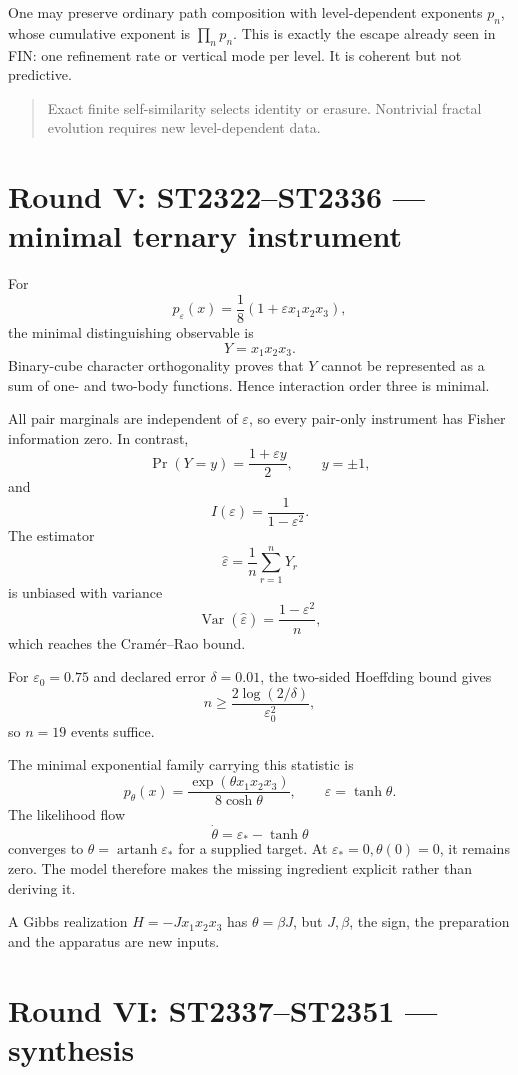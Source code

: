\documentclass[11pt,a4paper]{article}
\begin{document}
One may preserve ordinary path composition with level-dependent exponents
\(p_n\), whose cumulative exponent is \(\prod_n p_n\).  This is exactly the
escape already seen in FIN: one refinement rate or vertical mode per level.
It is coherent but not predictive.

\begin{quote}
Exact finite self-similarity selects identity or erasure.  Nontrivial fractal
evolution requires new level-dependent data.
\end{quote}

\section{Round V: ST2322--ST2336 --- minimal ternary instrument}

For
\[
 p_\varepsilon(x)=\frac18(1+\varepsilon x_1x_2x_3),
\]
the minimal distinguishing observable is
\[
 Y=x_1x_2x_3.
\]
Binary-cube character orthogonality proves that \(Y\) cannot be represented as
a sum of one- and two-body functions.  Hence interaction order three is
minimal.

All pair marginals are independent of \(\varepsilon\), so every pair-only
instrument has Fisher information zero.  In contrast,
\[
 \Pr(Y=y)=\frac{1+\varepsilon y}{2},\qquad y=\pm1,
\]
and
\[
 I(\varepsilon)=\frac1{1-\varepsilon^2}.
\]
The estimator
\[
 \widehat\varepsilon=\frac1n\sum_{r=1}^nY_r
\]
is unbiased with variance
\[
 \operatorname{Var}(\widehat\varepsilon)
 =\frac{1-\varepsilon^2}{n},
\]
which reaches the Cram\'er--Rao bound.

For \(\varepsilon_0=0.75\) and declared error \(\delta=0.01\), the two-sided
Hoeffding bound gives
\[
 n\geq\frac{2\log(2/\delta)}{\varepsilon_0^2},
\]
so \(n=19\) events suffice.

The minimal exponential family carrying this statistic is
\[
 p_\theta(x)
 =\frac{\exp(\theta x_1x_2x_3)}{8\cosh\theta},
 \qquad\varepsilon=\tanh\theta.
\]
The likelihood flow
\[
 \dot\theta=\varepsilon_*- \tanh\theta
\]
converges to \(\theta=\operatorname{artanh}\varepsilon_*\) for a supplied
target.  At \(\varepsilon_*=0,\theta(0)=0\), it remains zero.  The model
therefore makes the missing ingredient explicit rather than deriving it.

A Gibbs realization \(H=-Jx_1x_2x_3\) has \(\theta=\beta J\), but \(J,\beta\),
the sign, the preparation and the apparatus are new inputs.

\section{Round VI: ST2337--ST2351 --- synthesis}
\end{document}
